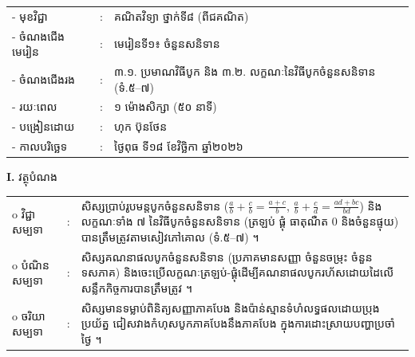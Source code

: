 \documentclass[a4paper,10pt]{article}
\newcommand{\wcirc}{{\CourierBullet\fontsize{9.5pt}{11pt}\selectfont o}}
\begin{document}
{\renewcommand{\arraystretch}{0.98}
\hspace*{3.1cm}%
\begin{tabular}{@{}l l L{11.0cm}@{}}
  - \hspace{0.35cm} មុខវិជ្ជា & : & គណិតវិទ្យា ថ្នាក់ទី៨ (ពីជគណិត) \\
  - \hspace{0.35cm} ចំណងជើងមេរៀន & : & មេរៀនទី១៖ ចំនួនសនិទាន \\
  - \hspace{0.35cm} ចំណងជើងរង & : & ៣.១. ប្រមាណវិធីបូក និង ៣.២. លក្ខណៈនៃវិធីបូកចំនួនសនិទាន (ទំ.៥–៧) \\
  - \hspace{0.35cm} រយៈពេល & : & ១ ម៉ោងសិក្សា (៥០ នាទី) \\
  - \hspace{0.35cm} បង្រៀនដោយ & : & ហុក ប៊ុនថែន \\
  - \hspace{0.35cm} កាលបរិច្ឆេទ & : & ថ្ងៃពុធ ទី១៨ ខែវិច្ឆិកា ឆ្នាំ២០២៦ \\
\end{tabular}

\vspace{2pt}

\textbf{I.} {\muol វត្ថុបំណង}\\[1pt]
\hspace*{0.55cm}%
\begin{tabular}{@{}l l L{14.2cm}@{}}
  \wcirc \hspace{0.25cm} វិជ្ជាសម្បទា & : & សិស្សប្រាប់រូបមន្តបូកចំនួនសនិទាន ($\frac{a}{b}+\frac{c}{b}=\frac{a+c}{b}$, $\frac{a}{b}+\frac{c}{d}=\frac{ad+bc}{bd}$) និងលក្ខណៈទាំង ៧ នៃវិធីបូកចំនួនសនិទាន (ត្រឡប់ ផ្គុំ ធាតុណឺត $0$ និងចំនួនផ្ទុយ) បានត្រឹមត្រូវតាមសៀវភៅគោល (ទំ.៥–៧) ។ \\
  \wcirc \hspace{0.25cm} បំណិនសម្បទា & : & សិស្សគណនាផលបូកចំនួនសនិទាន (ប្រភាគមានសញ្ញា ចំនួនចម្រុះ ចំនួនទសភាគ) និងចេះប្រើលក្ខណៈត្រឡប់-ផ្គុំដើម្បីគណនាផលបូករហ័សដោយដៃលើសន្លឹកកិច្ចការបានត្រឹមត្រូវ ។ \\
  \wcirc \hspace{0.25cm} ចរិយាសម្បទា & : & សិស្សមានទម្លាប់ពិនិត្យសញ្ញាភាគបែង និងប៉ាន់ស្មានទំហំលទ្ធផលដោយប្រុងប្រយ័ត្ន ជៀសវាងកំហុសបូកភាគបែងនឹងភាគបែង ក្នុងការដោះស្រាយបញ្ហាប្រចាំថ្ងៃ ។ \\
\end{tabular}

\vspace{2pt}

}
\end{document}

